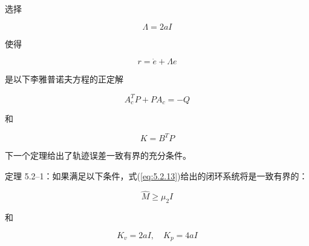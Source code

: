 \documentclass[UTF8,12pt,a4paper]{ctexart}
\begin{document}
选择

\begin{equation}\label{eq:5.2.16}
\Lambda = 2aI
\end{equation}

使得

\begin{equation}\label{eq:5.2.17}
r = \dot{e} + \Lambda e
\end{equation}

是以下李雅普诺夫方程的正定解

\begin{equation}\label{eq:5.2.18}
A_c^T P + PA_c = -Q
\end{equation}

和

\begin{equation}\label{eq:5.2.19}
K = B^T P
\end{equation}

下一个定理给出了轨迹误差一致有界的充分条件。

\begin{theorem}\label{thm:5.2.1}
定理 5.2--1：如果满足以下条件，式(\ref{eq:5.2.13})给出的闭环系统将是一致有界的：

\begin{equation}
\hat{M} \geq \mu_2 I
\end{equation}

和

\begin{equation}
K_v = 2aI, \quad K_p = 4aI
\end{equation}
\end{theorem}
\end{document}
